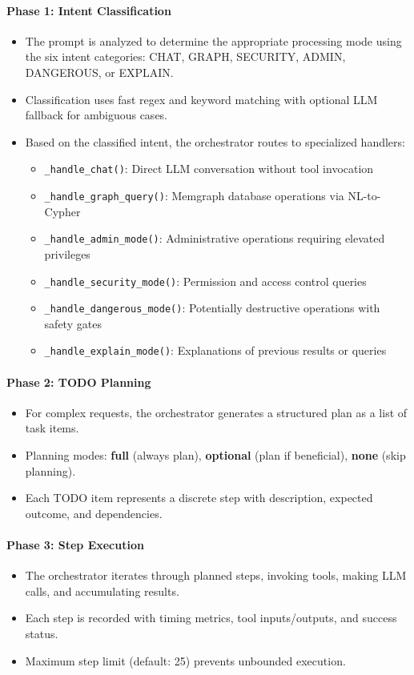 \documentclass[a4paper,twoside]{sapthesis}
\begin{document}
\paragraph{Phase 1: Intent Classification}
\begin{itemize}
    \item The prompt is analyzed to determine the appropriate processing mode using the six intent categories: CHAT, GRAPH, SECURITY, ADMIN, DANGEROUS, or EXPLAIN.
    \item Classification uses fast regex and keyword matching with optional LLM fallback for ambiguous cases.
    \item Based on the classified intent, the orchestrator routes to specialized handlers:
    \begin{itemize}
        \item \texttt{\_handle\_chat()}: Direct LLM conversation without tool invocation
        \item \texttt{\_handle\_graph\_query()}: Memgraph database operations via NL-to-Cypher
        \item \texttt{\_handle\_admin\_mode()}: Administrative operations requiring elevated privileges
        \item \texttt{\_handle\_security\_mode()}: Permission and access control queries
        \item \texttt{\_handle\_dangerous\_mode()}: Potentially destructive operations with safety gates
        \item \texttt{\_handle\_explain\_mode()}: Explanations of previous results or queries
    \end{itemize}
\end{itemize}

\paragraph{Phase 2: TODO Planning}
\begin{itemize}
    \item For complex requests, the orchestrator generates a structured plan as a list of task items.
    \item Planning modes: \textbf{full} (always plan), \textbf{optional} (plan if beneficial), \textbf{none} (skip planning).
    \item Each TODO item represents a discrete step with description, expected outcome, and dependencies.
\end{itemize}

\paragraph{Phase 3: Step Execution}
\begin{itemize}
    \item The orchestrator iterates through planned steps, invoking tools, making LLM calls, and accumulating results.
    \item Each step is recorded with timing metrics, tool inputs/outputs, and success status.
    \item Maximum step limit (default: 25) prevents unbounded execution.
\end{itemize}
\end{document}
